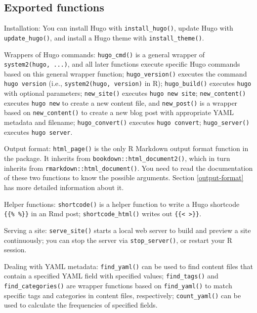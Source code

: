 \documentclass[12pt,]{krantz}
\theoremstyle{definition}
\theoremstyle{definition}
\theoremstyle{definition}
\theoremstyle{remark}
\begin{document}
\hypertarget{exported-functions}{%
\subsection{Exported functions}\label{exported-functions}}

Installation: You can install Hugo with \texttt{install\_hugo()}, update
Hugo with \texttt{update\_hugo()}, and install a Hugo theme with
\texttt{install\_theme()}.

Wrappers of Hugo commands: \texttt{hugo\_cmd()} is a general wrapper of
\texttt{system2(\textquotesingle{}hugo\textquotesingle{},\ ...)}, and
all later functions execute specific Hugo commands based on this general
wrapper function; \texttt{hugo\_version()} executes the command
\texttt{hugo\ version} (i.e.,
\texttt{system2(\textquotesingle{}hugo\textquotesingle{},\ \textquotesingle{}version\textquotesingle{})}
in R); \texttt{hugo\_build()} executes \texttt{hugo} with optional
parameters; \texttt{new\_site()} executes \texttt{hugo\ new\ site};
\texttt{new\_content()} executes \texttt{hugo\ new} to create a new
content file, and \texttt{new\_post()} is a wrapper based on
\texttt{new\_content()} to create a new blog post with appropriate YAML
metadata and filename; \texttt{hugo\_convert()} executes
\texttt{hugo\ convert}; \texttt{hugo\_server()} executes
\texttt{hugo\ server}.

Output format: \texttt{html\_page()} is the only R Markdown output
format function in the package. It inherits from
\texttt{bookdown::html\_document2()}, which in turn inherits from
\texttt{rmarkdown::html\_document()}. You need to read the documentation
of these two functions to know the possible arguments. Section
\ref{output-format} has more detailed information about it.

Helper functions: \texttt{shortcode()} is a helper function to write a
Hugo shortcode \texttt{\{\{\%\ \%\}\}} in an Rmd post;
\texttt{shortcode\_html()} writes out
\texttt{\{\{\textless{}\ \textgreater{}\}\}}.

Serving a site: \texttt{serve\_site()} starts a local web server to
build and preview a site continuously; you can stop the server via
\texttt{stop\_server()}, or restart your R session.

Dealing with YAML metadata: \texttt{find\_yaml()} can be used to find
content files that contain a specified YAML field with specified values;
\texttt{find\_tags()} and \texttt{find\_categories()} are wrapper
functions based on \texttt{find\_yaml()} to match specific tags and
categories in content files, respectively; \texttt{count\_yaml()} can be
used to calculate the frequencies of specified fields.
\end{document}
